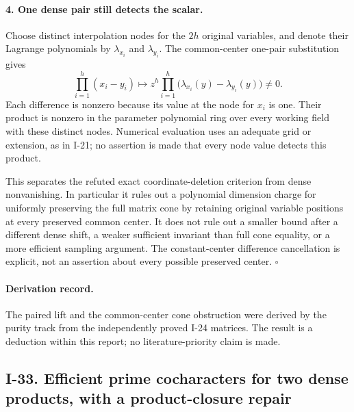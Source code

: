 \documentclass[11pt,a4paper]{article}
\theoremstyle{definition}\newtheorem{definition}{Definition}
\begin{document}
\paragraph{4. One dense pair still detects the scalar.}
Choose distinct interpolation nodes for the $2h$ original
variables, and denote their Lagrange polynomials by
$\lambda_{x_i}$ and $\lambda_{y_i}$. The common-center
one-pair substitution gives
\[
 \prod_{i=1}^h(x_i-y_i)
   \longmapsto
 z^h\prod_{i=1}^h
       \bigl(\lambda_{x_i}(y)-\lambda_{y_i}(y)\bigr)\ne0.
 \tag{I.61}
\]
Each difference is nonzero because its value at the node
for $x_i$ is one. Their product is nonzero in the parameter
polynomial ring over every working field with these distinct
nodes. Numerical evaluation uses an adequate grid or extension,
as in I-21; no assertion is made that every node value detects
this product.

This separates the refuted exact coordinate-deletion criterion
from dense nonvanishing. In particular it rules out a polynomial
dimension charge for uniformly preserving the full matrix cone
by retaining original variable positions at every preserved
common center. It does not rule out a smaller bound after a
different dense shift, a weaker sufficient invariant than full
cone equality, or a more efficient sampling argument. The
constant-center difference cancellation is explicit, not an
assertion about every possible preserved center. $\square$

\paragraph{Derivation record.}
The paired lift and the common-center cone obstruction were
derived by the purity track from the independently proved
I-24 matrices. The result is a deduction within this report;
no literature-priority claim is made.


\subsection{I-33. Efficient prime cocharacters for two dense products, with a product-closure repair}
\label{I-33}
\end{document}
